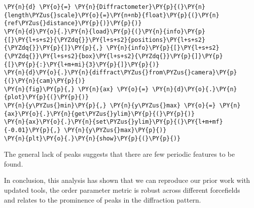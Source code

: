     \begin{tcolorbox}[breakable, size=fbox, boxrule=1pt, pad at break*=1mm,colback=cellbackground, colframe=cellborder]
\begin{Verbatim}[commandchars=\\\{\}]
\PY{n}{d} \PY{o}{=} \PY{n}{Diffractometer}\PY{p}{(}\PY{n}{length\PYZus{}scale}\PY{o}{=}\PY{n+nb}{float}\PY{p}{(}\PY{n}{ref\PYZus{}distance}\PY{p}{)}\PY{p}{)}
\PY{n}{d}\PY{o}{.}\PY{n}{load}\PY{p}{(}\PY{n}{info}\PY{p}{[}\PY{l+s+s2}{\PYZdq{}}\PY{l+s+s2}{positions}\PY{l+s+s2}{\PYZdq{}}\PY{p}{]}\PY{p}{,} \PY{n}{info}\PY{p}{[}\PY{l+s+s2}{\PYZdq{}}\PY{l+s+s2}{box}\PY{l+s+s2}{\PYZdq{}}\PY{p}{]}\PY{p}{[}\PY{p}{:}\PY{l+m+mi}{3}\PY{p}{]}\PY{p}{)}
\PY{n}{d}\PY{o}{.}\PY{n}{diffract\PYZus{}from\PYZus{}camera}\PY{p}{(}\PY{n}{cam}\PY{p}{)}
\PY{n}{fig}\PY{p}{,} \PY{n}{ax} \PY{o}{=} \PY{n}{d}\PY{o}{.}\PY{n}{plot}\PY{p}{(}\PY{p}{)}
\PY{n}{y\PYZus{}min}\PY{p}{,} \PY{n}{y\PYZus{}max} \PY{o}{=} \PY{n}{ax}\PY{o}{.}\PY{n}{get\PYZus{}ylim}\PY{p}{(}\PY{p}{)}
\PY{n}{ax}\PY{o}{.}\PY{n}{set\PYZus{}ylim}\PY{p}{(}\PY{l+m+mf}{-0.01}\PY{p}{,} \PY{n}{y\PYZus{}max}\PY{p}{)}
\PY{n}{plt}\PY{o}{.}\PY{n}{show}\PY{p}{(}\PY{p}{)}
\end{Verbatim}
\end{tcolorbox}

    \begin{center}
    \end{center}
    
    The general lack of peaks suggests that there are few periodic features
to be found.

In conclusion, this analysis has shown that we can reproduce our prior
work with updated tools, the order parameter metric is robust across
different forcefields and relates to the prominence of peaks in the
diffraction pattern.

    \begin{tcolorbox}[breakable, size=fbox, boxrule=1pt, pad at break*=1mm,colback=cellbackground, colframe=cellborder]
\begin{Verbatim}[commandchars=\\\{\}]

\end{Verbatim}
\end{tcolorbox}

